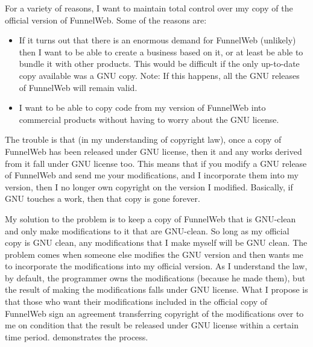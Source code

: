For a variety of reasons, I want to maintain
total control over \i{my} copy of the official version of FunnelWeb.
Some of the reasons are:

\begin{itemize}

\item If it turns out that there is an enormous demand for
FunnelWeb (unlikely) then
I want to be able to create a business based on it, or at least
be able to bundle it with other products.
This would be difficult if the only up-to-date copy available was a GNU copy.
Note: If this happens, all the GNU releases of FunnelWeb will remain
valid.

\item I want to be able to copy code from my version of FunnelWeb
into commercial products without having to worry about the GNU license.

\end{itemize}

The trouble is that (in my understanding of copyright law),
once a copy of FunnelWeb has been released under GNU license, then it
and any works derived from it fall under GNU license too. This means that
if you modify a GNU release of 
FunnelWeb and send me your modifications, and I incorporate
them into my version, then I no longer own copyright on the version I
modified. Basically, if GNU touches a work, then that copy is gone forever.

My solution to the problem is to keep a copy of FunnelWeb that is
GNU-clean and only make modifications to it that are GNU-clean. So
long as my official copy is GNU clean, any modifications that I make
myself will be GNU clean. The problem comes when someone else modifies
the GNU version and then wants me to incorporate the modifications into
my official version. As I understand the law, by default, the programmer
owns the modifications (because he made them), but the result of making
the modifications falls under GNU license. What I propose is that those
who want their modifications included in the official copy of FunnelWeb
sign an agreement transferring copyright of the modifications over to
me on condition that the result be released under GNU license within
a certain time period. \figlicense{} demonstrates the process.

